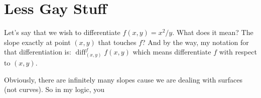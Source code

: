 \documentclass{report}
\DeclareMathOperator{\diff}{diff}
\begin{document}
    \section{Less Gay Stuff}
        Let's say that we wish to differentiate $f(x,y) = x^2/y$. What does it mean? The slope exactly at point $(x,y)$ that touches $f$? And by the way, my notation for that differentiation is: $\diff^f_{(x,y)} f(x,y)$ which means differentiate $f$ with respect to $(x,y)$.
        
        Obviously, there are infinitely many slopes cause we are dealing with surfaces (not curves). So in my logic, you 
\end{document}
